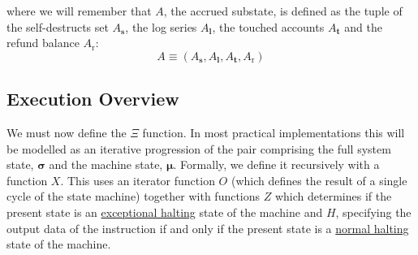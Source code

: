 \documentclass[9pt,oneside]{amsart}
\makeatletter
\newcommand{\linkdest}[1]{\Hy@raisedlink{\hypertarget{#1}{}}}
\makeatother
\begin{document}
\begin{multicols}{2}
where we will remember that $A$, the accrued substate, is defined as the tuple of the self-destructs set $A_{\mathbf{s}}$, the log series $A_{\mathbf{l}}$, the touched accounts $A_{\mathbf{t}}$ and the refund balance $A_{\mathrm{r}}$:
\begin{equation}
A \equiv (A_{\mathbf{s}}, A_{\mathbf{l}}, A_{\mathbf{t}}, A_{\mathrm{r}})
\end{equation}

\subsection{Execution Overview}

\linkdest{xi_def}
We must now define the $\Xi$ function. In most practical implementations this will be modelled as an iterative progression of the pair comprising the full system state, $\boldsymbol{\sigma}$ and the machine state, $\boldsymbol{\mu}$. Formally, we define it recursively with a function $X$. This uses an iterator function $O$ (which defines the result of a single cycle of the state machine) together with functions \hyperlink{zhalt}{$Z$} which determines if the present state is an \hyperlink{zhalt}{exceptional halting} state of the machine and \hyperlink{hhalt}{$H$}, specifying the output data of the instruction if and only if the present state is a \hyperlink{hhalt}{normal halting} state of the machine.


\end{multicols}
\end{document}
